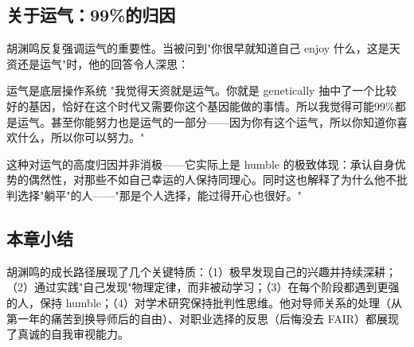 \subsection{关于运气：99\%的归因}

胡渊鸣反复强调运气的重要性。当被问到"你很早就知道自己 enjoy 什么，这是天资还是运气"时，他的回答令人深思：

\begin{importantbox}{运气是底层操作系统}
"我觉得天资就是运气。你就是 genetically 抽中了一个比较好的基因，恰好在这个时代又需要你这个基因能做的事情。所以我觉得可能99\%都是运气。甚至你能努力也是运气的一部分——因为你有这个运气，所以你知道你喜欢什么，所以你可以努力。"
\end{importantbox}

这种对运气的高度归因并非消极——它实际上是 humble 的极致体现：承认自身优势的偶然性，对那些不如自己幸运的人保持同理心。同时这也解释了为什么他不批判选择"躺平"的人——"那是个人选择，能过得开心也很好。"

\subsection{本章小结}

胡渊鸣的成长路径展现了几个关键特质：（1）极早发现自己的兴趣并持续深耕；（2）通过实践"自己发现"物理定律，而非被动学习；（3）在每个阶段都遇到更强的人，保持 humble；（4）对学术研究保持批判性思维。他对导师关系的处理（从第一年的痛苦到换导师后的自由）、对职业选择的反思（后悔没去 FAIR）都展现了真诚的自我审视能力。

